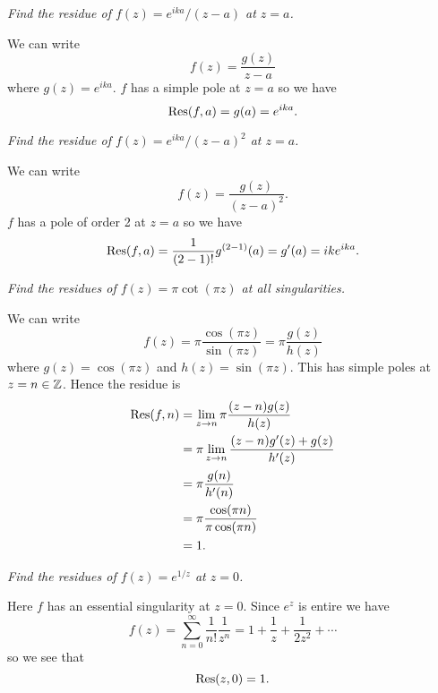\documentclass{article}
\begin{document}
    \begin{example}
        \emph{Find the residue of \(f(z) = e^{ika}/(z - a)\) at \(z = a\).}
        
        We can write
        \[f(z) = \frac{g(z)}{z - a}\]
        where \(g(z) = e^{ika}\).
        \(f\) has a simple pole at \(z = a\) so we have
        \[\Res(f, a) = g(a) = e^{ika}.\]
    \end{example}
    \begin{example}
        \emph{Find the residue of \(f(z) = e^{ika}/(z - a)^2\) at \(z = a\).}
        
        We can write
        \[f(z) = \frac{g(z)}{(z - a)^2}.\]
        \(f\) has a pole of order 2 at \(z = a\) so we have
        \[\Res(f, a) = \frac{1}{(2 - 1)!}g^{(2 - 1)}(a) = g'(a) = ike^{ika}.\]
    \end{example}
    \begin{example}\label{exa:residues of pi cot pi z}
        \emph{Find the residues of \(f(z) = \pi\cot(\pi z)\) at all singularities.}
        
        We can write
        \[f(z) = \pi\frac{\cos(\pi z)}{\sin(\pi z)} = \pi\frac{g(z)}{h(z)}\]
        where \(g(z) = \cos(\pi z)\) and \(h(z) = \sin(\pi z)\).
        This has simple poles at \(z = n\in\mathbb{Z}\).
        Hence the residue is
        \begin{align*}
            \Res(f, n) &= \lim_{z\to n} \pi \frac{(z-n)g(z)}{h(z)}\\
            &= \pi \lim_{z\to n} \frac{(z - n)g'(z) + g(z)}{h'(z)}\\
            &= \pi \frac{g(n)}{h'(n)}\\
            &= \pi \frac{\cos(\pi n)}{\pi\cos(\pi n)}\\
            &= 1.
        \end{align*}
    \end{example}
    \begin{example}
        \emph{Find the residues of \(f(z) = e^{1/z}\) at \(z = 0\).}
        
        Here \(f\) has an essential singularity at \(z = 0\).
        Since \(e^{z}\) is entire we have
        \[f(z) = \sum_{n=0}^{\infty}\frac{1}{n!}\frac{1}{z^n} = 1 + \frac{1}{z} + \frac{1}{2z^2} + \dotsb\]
        so we see that
        \[\Res(z, 0) = 1.\]
    \end{example}
\end{document}
